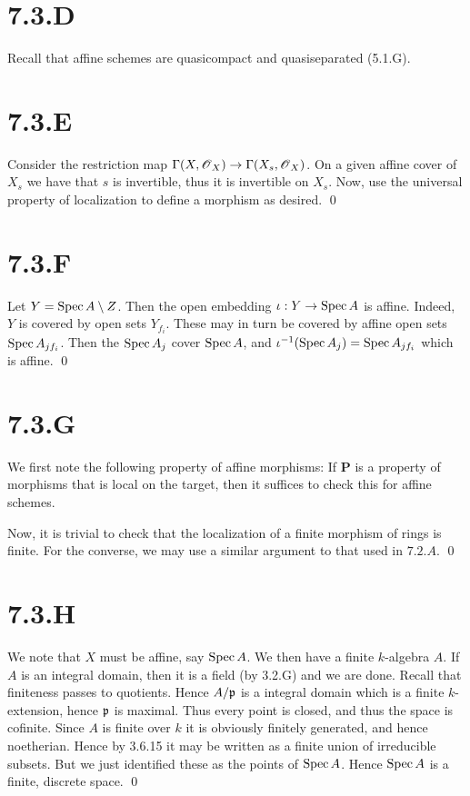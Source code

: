 \documentclass{article}
\begin{document}
\section{7.3.D}
Recall that affine schemes are quasicompact and quasiseparated (5.1.G).

\section{7.3.E}
Consider the restriction map $\Gamma(X, \operatorname{\mathscr{O}}_X) \to \Gamma(X_s, \operatorname{\mathscr{O}}_X)$. On a
given affine cover of $X_s$ we have that $s$ is invertible, thus it is
invertible on $X_s$. Now, use the universal property of localization to define
a morphism as desired. \qed

\section{7.3.F}
Let $Y=\operatorname{Spec} A \setminus Z$. Then the open embedding $\iota: Y \to \operatorname{Spec} A$ is
affine. Indeed, $Y$ is covered by open sets $Y_{f_i}$. These may in turn be
covered by affine open sets $\operatorname{Spec} A_{jf_i}$. Then the $\operatorname{Spec} A_j$ cover $\operatorname{Spec}
    A$, and $\iota^{-1}(\operatorname{Spec} A_j)=\operatorname{Spec} A_{jf_i}$ which is affine. \qed

\section{7.3.G}
We first note the following property of affine morphisms: If $\mathbf{P}$ is a
property of morphisms that is local on the target, then it suffices to check
this for affine schemes.

Now, it is trivial to check that the localization of a finite morphism of rings
is finite. For the converse, we may use a similar argument to that used in
$7.2.A$. \qed

\section{7.3.H}
We note that $X$ must be affine, say $\operatorname{Spec} A$. We then have a finite
$k$-algebra $A$. If $A$ is an integral domain, then it is a field (by 3.2.G)
and we are done. Recall that finiteness passes to quotients. Hence $A/\mathfrak{p}$ is a
integral domain which is a finite $k$-extension, hence $\mathfrak{p}$ is maximal. Thus
every point is closed, and thus the space is cofinite. Since $A$ is finite over
$k$ it is obviously finitely generated, and hence noetherian. Hence by 3.6.15
it may be written as a finite union of irreducible subsets. But we just
identified these as the points of $\operatorname{Spec} A$. Hence $\operatorname{Spec} A$ is a finite,
discrete space. \qed
\end{document}
